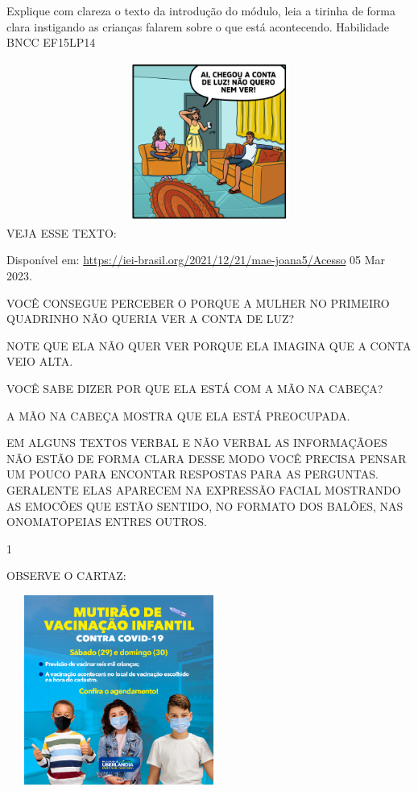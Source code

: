 {{Explique com clareza o texto da introdução do módulo, leia a tirinha de
forma clara instigando as crianças falarem sobre o que está acontecendo.
Habilidade BNCC EF15LP14

\includegraphics[width=5.76119in,height=2.06716in]{media/image125.jpeg}VEJA
ESSE TEXTO:

Disponível em: \url{https://iei-brasil.org/2021/12/21/mae-joana5/Acesso}
05 Mar 2023.

VOCÊ CONSEGUE PERCEBER O PORQUE A MULHER NO PRIMEIRO QUADRINHO NÃO
QUERIA VER A CONTA DE LUZ?

NOTE QUE ELA NÃO QUER VER PORQUE ELA IMAGINA QUE A CONTA VEIO ALTA.

VOCÊ SABE DIZER POR QUE ELA ESTÁ COM A MÃO NA CABEÇA?

A MÃO NA CABEÇA MOSTRA QUE ELA ESTÁ PREOCUPADA.

EM ALGUNS TEXTOS VERBAL E NÃO VERBAL AS INFORMAÇÃOES NÃO ESTÃO DE FORMA
CLARA DESSE MODO VOCÊ PRECISA PENSAR UM POUCO PARA ENCONTAR RESPOSTAS
PARA AS PERGUNTAS. GERALENTE ELAS APARECEM NA EXPRESSÃO FACIAL MOSTRANDO
AS EMOCÕES QUE ESTÃO SENTIDO, NO FORMATO DOS BALÕES, NAS ONOMATOPEIAS
ENTRES OUTROS.


\num{1}

OBSERVE O CARTAZ:

\includegraphics[width=2.89864in,height=2.45070in]{media/image128.png}

}}
